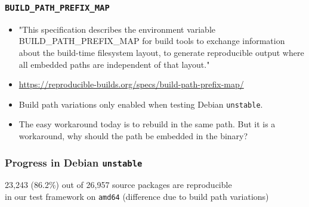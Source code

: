 \documentclass[14pt,aspectratio=169]{beamer}
\newif\ifplacelogo
\begin{document}
\begin{frame}
 \frametitle{\texttt{BUILD\_PATH\_PREFIX\_MAP}}
 \begin{itemize}
  \item "This specification describes the environment variable BUILD\_PATH\_PREFIX\_MAP for build tools to exchange information about the build-time filesystem layout, to generate reproducible output where all embedded paths are independent of that layout."
  \item \url{https://reproducible-builds.org/specs/build-path-prefix-map/}
  \item<2-3> Build path variations only enabled when testing Debian \texttt{unstable}.
  \item<3> The easy workaround today is to rebuild in the same path. But it is a workaround, why should the path be embedded in the binary?
 \end{itemize}
\end{frame}


\placelogotrue



\begin{frame}
 \frametitle{Progress in Debian \texttt{unstable}}
 \begin{center}
  \footnotesize{23,243 (86.2\%) out of 26,957 source packages are reproducible \\
    in our test framework on \texttt{amd64}} (difference due to build path variations)
  \vfill
 \end{center}
\end{frame}
\end{document}
